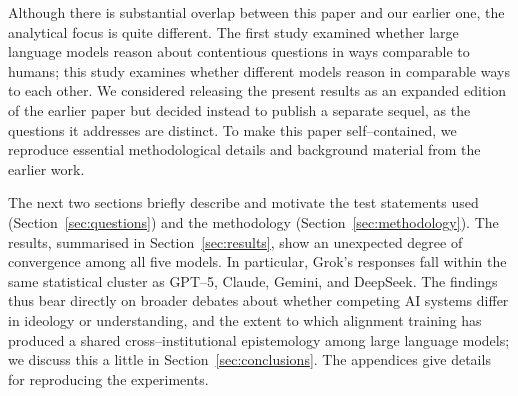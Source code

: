 \documentclass[12pt]{article}
\begin{document}
Although there is substantial overlap between this paper and our earlier one, the analytical focus is quite different.  The first study examined whether large language models reason about contentious questions in ways comparable to humans; this study examines whether different models reason in comparable ways to each other.  We considered releasing the present results as an expanded edition of the earlier paper but decided instead to publish a separate sequel, as the questions it addresses are distinct.  To make this paper self--contained, we reproduce essential methodological details and background material from the earlier work.

The next two sections briefly describe and motivate the test statements used (Section~\ref{sec:questions}) and the methodology (Section~\ref{sec:methodology}). The results, summarised in Section~\ref{sec:results}, show an unexpected degree of convergence among all five models.  In particular, Grok’s responses fall within the same statistical cluster as GPT--5, Claude, Gemini, and DeepSeek.  The findings thus bear directly on broader debates about whether competing AI systems differ in ideology or understanding, and the extent to which alignment training has produced a shared cross--institutional epistemology among large language models; we discuss this a little in Section~\ref{sec:conclusions}. The appendices give details for reproducing the experiments.
\end{document}
